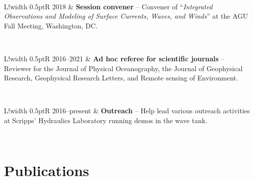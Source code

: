 \documentclass[10pt]{article}
\newcommand\VRule{\color{lightgray}\vrule width 0.5pt}
\begin{document}
\\[10pt]
\begin{tabular}{L!{\VRule}R}
2018  & \textbf{Session convener} -- Convener of ``\textit{Integrated Observations and Modeling of Surface Currents, Waves, and Winds}'' at the AGU Fall Meeting, Washington, DC. \\[5pt] 
\end{tabular}
\\[10pt]
\begin{tabular}{L!{\VRule}R}
2016--2021 & \textbf{Ad hoc referee for scientific journals} -- Reviewer for the Journal of Physical Oceanography, the Journal of Geophysical Research, Geophysical Research Letters, and Remote sensing of Environment.\\[5pt] 
\end{tabular}
\\[10pt]
\begin{tabular}{L!{\VRule}R}
2016--present & \textbf{Outreach} -- Help lead various outreach activities at Scripps' Hydraulics Laboratory running demos in the wave tank.\\[5pt]\end{tabular}
\\[10pt]

\section*{Publications}
\vspace{.3cm}
\end{document}
